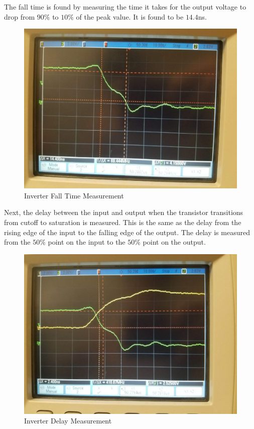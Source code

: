 The fall time is found by measuring the time it takes for the output voltage to drop from $90\%$ to $10\%$ of the peak value. It is found to be $14.4$\si{\nano\second}.

\FloatBarrier
\begin{figure}[h!]
	\centering
	\includegraphics[scale=0.25]{./images/inverter_tf.jpeg}
	\caption{Inverter Fall Time Measurement}
	\label{fig:inverter_fall_time}
\end{figure}
\FloatBarrier

Next, the delay between the input and output when the transistor transitions from cutoff to saturation is measured. This is the same as the delay from the rising edge of the input to the falling edge of the output. The delay is measured from the $50\%$ point on the input to the $50\%$ point on the output.

\FloatBarrier
\begin{figure}[h!]
	\centering
	\includegraphics[scale=0.25]{./images/inverter_input_rising_td.jpeg}
	\caption{Inverter Delay Measurement}
	\label{fig:inverter_time_delay}
\end{figure}
\FloatBarrier

